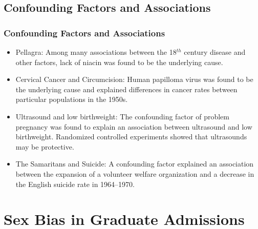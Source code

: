 \documentclass[t,xcolor=pst,dvips]{beamer}
\begin{document}
\subsection{Confounding Factors and Associations}
\begin{frame}[t]\frametitle{Confounding Factors and Associations}
{\small
\begin{itemize}
\item Pellagra:  Among many associations between the 18${}^{th}$ century disease and other factors, lack of niacin
  was found to be the underlying cause.
\item Cervical Cancer and Circumcision: Human papilloma virus was found to be the underlying cause
  and explained differences in cancer rates between particular populations in the 1950s.
\item Ultrasound and low birthweight:  The confounding factor of problem pregnancy was found to 
  explain an association between ultrasound and low birthweight.  Randomized controlled experiments 
  showed that ultrasounds may be protective.
\item The Samaritans and Suicide:  A confounding factor explained an association between the 
  expansion of a volunteer welfare organization and a decrease in the English suicide rate 
  in 1964--1970.
\end{itemize}
}
\end{frame}


\section{Sex Bias in Graduate Admissions}
\end{document}
